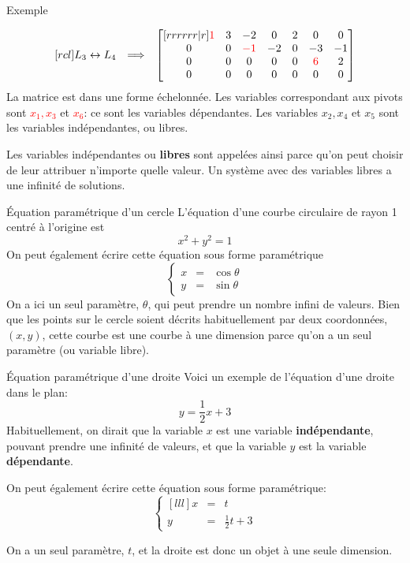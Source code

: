 \documentclass[french]{beamer}
\begin{document}
\begin{frame}{Exemple}

		\[
			\begin{matrix}[rcl]
		L_3  \leftrightarrow L_4
		&\Longrightarrow&
		\begin{bmatrix}[rrrrrr|r]
		\textcolor{red}{1} & 3 & -2 & 0 & 2 & 0 & 0 \\
		0 & 0 & \textcolor{red}{-1} & -2 & 0 & -3 & -1\\
		0 & 0 & 0 & 0 & 0 & \textcolor{red}{6} & 2\\
		0 & 0 & 0 & 0 & 0 & 0 & 0
		\end{bmatrix}
	\end{matrix}
	\]
	La matrice est dans une forme échelonnée. 
	Les variables correspondant aux pivots sont \textcolor{red}{$x_1, x_3$} et \textcolor{red}{$x_6$}: 
	ce sont les variables dépendantes.
	Les variables $x_2, x_4$ et $x_5$ sont les variables indépendantes, ou libres.
	\vfill
	
	Les variables indépendantes ou \textbf{libres} sont appelées ainsi parce qu'on peut choisir de leur
	attribuer n'importe quelle valeur. Un système avec
	des variables libres a une infinité de solutions.
\end{frame}

\begin{frame}{Équation paramétrique d'un cercle}
L'équation d'une courbe circulaire de rayon 1 centré à l'origine est
\[
x^2 + y^2 = 1
\]
On peut également écrire cette équation sous forme
paramétrique  
\[
\left\{
\begin{matrix}
x &=&\cos\theta \\
y &=& \sin\theta
\end{matrix}
\right.
\]
On a ici un seul paramètre, $\theta$, qui peut prendre
un nombre infini de valeurs. Bien que les points sur le cercle soient décrits habituellement par deux coordonnées,
$(x, y)$, cette courbe est une courbe à une dimension parce qu'on a un seul paramètre (ou variable libre).
\end{frame}

\begin{frame}{Équation paramétrique d'une droite}
Voici un exemple de l'équation d'une droite dans
le plan:
\[
y = \frac12 x + 3
\]
Habituellement, on dirait que la variable $x$ est une
variable \textbf{indépendante}, pouvant prendre une infinité
de valeurs, et que la variable $y$ est la variable \textbf{dépendante}.

On peut également écrire cette équation sous forme
paramétrique:
\[
\left\{
\begin{matrix}[lll]
x &=& t \\
y &=& \frac12 t + 3
\end{matrix}
\right.
\]

On a un seul paramètre, $t$, et la droite est donc
un objet à une seule dimension.
\end{frame}
\end{document}
